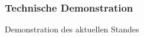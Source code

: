 
\begin{frame}
    \frametitle{Technische Demonstration}{Demonstration des aktuellen Standes}

\end{frame}
\clearpage

